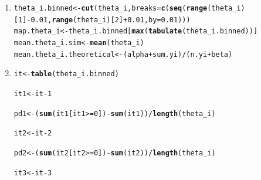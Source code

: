 \documentclass{article}\usepackage[]{graphicx}\usepackage[]{color}
\makeatletter
\newcommand{\hlnum}[1]{\textcolor[rgb]{0.686,0.059,0.569}{#1}}%
\newcommand{\hlopt}[1]{\textcolor[rgb]{0,0,0}{#1}}%
\newcommand{\hlstd}[1]{\textcolor[rgb]{0.345,0.345,0.345}{#1}}%
\newcommand{\hlkwb}[1]{\textcolor[rgb]{0.69,0.353,0.396}{#1}}%
\newcommand{\hlkwc}[1]{\textcolor[rgb]{0.333,0.667,0.333}{#1}}%
\newcommand{\hlkwd}[1]{\textcolor[rgb]{0.737,0.353,0.396}{\textbf{#1}}}%
\newenvironment{kframe}{%
 \def\at@end@of@kframe{}%
 \ifinner\ifhmode%
  \def\at@end@of@kframe{\end{minipage}}%
  \begin{minipage}{\columnwidth}%
 \fi\fi%
 \def\FrameCommand##1{\hskip\@totalleftmargin \hskip-\fboxsep
 \colorbox{shadecolor}{##1}\hskip-\fboxsep
     \hskip-\linewidth \hskip-\@totalleftmargin \hskip\columnwidth}%
 \MakeFramed {\advance\hsize-\width
   \@totalleftmargin\z@ \linewidth\hsize
   \@setminipage}}%
 {\par\unskip\endMakeFramed%
 \at@end@of@kframe}
\newenvironment{knitrout}{}{} %
\makeatother
\begin{document}
{\begin{enumerate}
\begin{enumerate}
\begin{knitrout}
\begin{kframe}
\begin{alltt}
\hlstd{ub} \hlkwb{<-} \hlkwd{qgamma}\hlstd{(}\hlnum{0.975}\hlstd{,} \hlkwc{shape} \hlstd{= alpha} \hlopt{+} \hlstd{sum.yi,} \hlkwc{rate} \hlstd{= beta} \hlopt{+} \hlstd{n.yi)}

\hlstd{point.est} \hlkwb{<-} \hlkwd{mean}\hlstd{(theta_i)}\hlopt{/}\hlnum{8}
\end{alltt}
\end{kframe}
\end{knitrout}
\item%
\begin{knitrout}
\color{fgcolor}\begin{kframe}
\begin{alltt}
\hlstd{theta_i.binned} \hlkwb{<-} \hlkwd{cut}\hlstd{(theta_i,} \hlkwc{breaks} \hlstd{=} \hlkwd{c}\hlstd{(}\hlkwd{seq}\hlstd{(}\hlkwd{range}\hlstd{(theta_i)[}\hlnum{1}\hlstd{]}\hlopt{-}\hlnum{0.01}\hlstd{,}\hlkwd{range}\hlstd{(theta_i)[}\hlnum{2}\hlstd{]}\hlopt{+}\hlnum{0.01}\hlstd{,} \hlkwc{by} \hlstd{=} \hlnum{0.01}\hlstd{)))}
\hlstd{map.theta_i} \hlkwb{<-} \hlstd{theta_i.binned[}\hlkwd{max}\hlstd{(}\hlkwd{tabulate}\hlstd{(theta_i.binned))]}
\hlstd{mean.theta_i.sim} \hlkwb{<-} \hlkwd{mean}\hlstd{(theta_i)}
\hlstd{mean.theta_i.theoretical} \hlkwb{<-} \hlstd{(alpha} \hlopt{+} \hlstd{sum.yi)}\hlopt{/}\hlstd{(n.yi}\hlopt{+}\hlstd{beta)}
\end{alltt}
\end{kframe}
\end{knitrout}
\item%
\begin{knitrout}
\color{fgcolor}\begin{kframe}
\begin{alltt}
\hlstd{it} \hlkwb{<-} \hlkwd{table}\hlstd{(theta_i.binned)}

\hlstd{it1} \hlkwb{<-} \hlstd{it} \hlopt{-} \hlnum{1}

\hlstd{pd1} \hlkwb{<-} \hlstd{(}\hlkwd{sum}\hlstd{(it1[it1}\hlopt{>=}\hlnum{0}\hlstd{])} \hlopt{-} \hlkwd{sum}\hlstd{(it1))}\hlopt{/}\hlkwd{length}\hlstd{(theta_i)}

\hlstd{it2} \hlkwb{<-} \hlstd{it} \hlopt{-} \hlnum{2}

\hlstd{pd2} \hlkwb{<-} \hlstd{(}\hlkwd{sum}\hlstd{(it2[it2}\hlopt{>=}\hlnum{0}\hlstd{])} \hlopt{-} \hlkwd{sum}\hlstd{(it2))}\hlopt{/}\hlkwd{length}\hlstd{(theta_i)}

\hlstd{it3} \hlkwb{<-} \hlstd{it} \hlopt{-} \hlnum{3}


\end{alltt}
\end{kframe}
\end{knitrout}
\end{enumerate}
\end{enumerate}}
\end{document}
